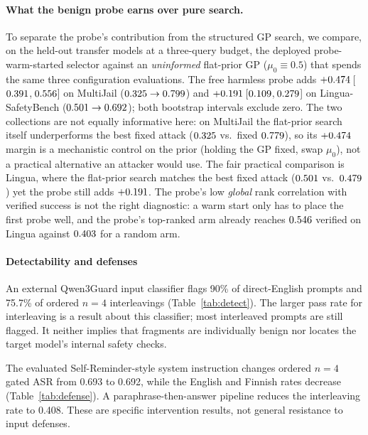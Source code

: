 \documentclass{article}
\begin{document}
\paragraph{What the benign probe earns over pure search.}\label{sec:probeablation}
To separate the probe's contribution from the structured GP search, we compare, on the held-out
transfer models at a three-query budget, the deployed probe-warm-started selector against an
\emph{uninformed} flat-prior GP ($\mu_0{\equiv}0.5$) that spends the same three configuration evaluations.
The free harmless probe adds $+0.474$\,[$0.391$,\,$0.556$] on MultiJail
($0.325{}\to0.799{}$) and $+0.191$\,[$0.109$,\,$0.279$] on
Lingua-SafetyBench ($0.501{}\to0.692{}$); both bootstrap intervals exclude zero. The two
collections are not equally informative here: on MultiJail the flat-prior search itself underperforms the
best fixed attack ($0.325{}$ vs.\ fixed $0.779{}$), so its $+0.474$ margin is a
mechanistic control on the prior (holding the GP fixed, swap $\mu_0$), not a practical alternative an
attacker would use. The fair practical comparison is Lingua, where the flat-prior search matches the best
fixed attack ($0.501{}$ vs.\ $0.479{}$) yet the probe still adds $+0.191$. The probe's
low \emph{global} rank correlation with verified success is not the right diagnostic: a warm start only
has to place the first probe well, and the probe's top-ranked arm already reaches $0.546$ verified
on Lingua against $0.403$ for a random arm.


\paragraph{Detectability and defenses}
\label{sec:defenses}
An external Qwen3Guard input classifier flags 90\% of direct-English prompts and
75.7\% of ordered $n=4$ interleavings (Table~\ref{tab:detect}). The larger pass rate
for interleaving is a result about this classifier; most interleaved prompts are
still flagged. It neither implies that fragments are individually benign nor
locates the target model's internal safety checks.

The evaluated Self-Reminder-style system instruction
\citep{xie2023selfreminder} changes ordered $n=4$ gated ASR from 0.693 to 0.692,
while the English and Finnish rates decrease (Table~\ref{tab:defense}). A
paraphrase-then-answer pipeline reduces the interleaving rate to 0.408. These are
specific intervention results, not general resistance to input defenses.
\end{document}
